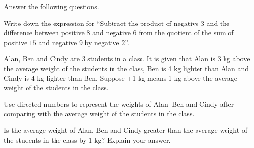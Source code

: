  Answer the following questions.

\begin{subparts}
  \item Write down the expression for ``Subtract the product of negative $3$ and the difference between positive $8$ and negative $6$ from the quotient of the sum of positive $15$ and negative $9$ by negative $2$''.

  \item Alan, Ben and Cindy are 3 students in a class. It is given that Alan is 3 kg above the average weight of the students in the class, Ben is 4 kg lighter than Alan and Cindy is
  4 kg lighter than Ben. Suppose +1 kg means 1 kg above the average weight of the students in the class.
  \begin{subpartsii}
    \item Use directed numbers to represent the weights of Alan, Ben and Cindy after comparing with the average weight of the students in the class.
    \item Is the average weight of Alan, Ben and Cindy greater than the average weight of the students in the class by 1 kg? Explain your answer.
  \end{subpartsii}
\end{subparts}

